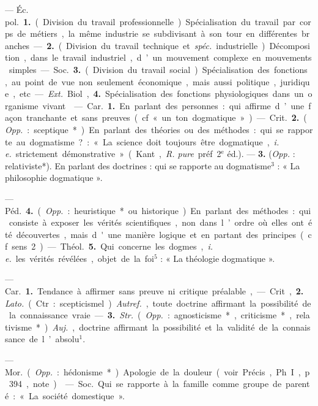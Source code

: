 \begin{itemize}[leftmargin=1cm, label=, itemsep=1pt]
 — \si{Éc. pol.} {\bf 1.} (Division du travail professionnelle). Spécialisation du travail par corps de
métiers, la même industrie se subdivisant à son tour en différentes
branches. — {\bf 2.} (Division du travail
technique et {\it spéc.} industrielle.) Décomposition, dans le travail industriel, d’un mouvement complexe en
mouvements simples.

— \si{Soc.} {\bf 3.} (Division du travail
social.) Spécialisation des fonctions,
au point de vue non seulement
économique, mais aussi politique,
juridique, etc.

— {\it Ext.} Biol, {\bf 4.} Spécialisation
des fonctions physiologiques dans un
organisme vivant.

 — \si{Car.} {\bf 1.} En parlant
des personnes : qui. affirme d’une
façon tranchante et sans preuves
(cf. « un ton dogmatique »).

— \si{Crit.} {\bf 2.} ({\it Opp.} : sceptique*). En
parlant des théories ou des méthodes : qui se rapporte au dogmatisme? : « La science doit toujours
être dogmatique, {\it i. e.} strictement
démonstrative » (Kant., {\it R. pure}
préf. 2$^\text{e}$ éd.). — {\bf 3.} ({\it Opp.} : relativiste*). En parlant des doctrines :
qui se rapporte au dogmatisme$^3$ :
« La philosophie dogmatique ».

— \si{Péd.} {\bf 4.} ({\it Opp.} : heuristique* ou
historique). En parlant des méthodes : qui consiste à exposer les vérités scientifiques, non dans l’ordre
où elles ont été découvertes, mais
d'une manière logique et en partant des principes (cf. sens 2).

— \si{Théol.} {\bf 5.} Qui concerne les
dogmes, {\it i. e.} les vérités révélées,
objet de la foi$^5$ : « La théologie dogmatique ».

 — \si{Car.} {\bf 1.} Tendance à
affirmer sans preuve ni critique
préalable,

— Crit, {\bf 2.} {\it Lato.} (Ctr. : scepticismel). {\it Autref.}, toute doctrine affirmant la possibilité de la connaissance vraie. — {\bf 3.} {\it Str.} ({\it Opp.} : agnosticisme*, criticisme*, relativisme*).
{\it Auj.}, doctrine affirmant la possibilité et la validité de la connaissance
de l’absolu$^1$.

 — \si{Mor.} ({\it Opp.} : hédonisme*).
Apologie de la douleur (voir Précis,
Ph. I, p. 394, note).

 — \si{Soc.} Qui se rapporte à
la famille comme groupe de parenté :
« La société domestique ».


\end{itemize}

